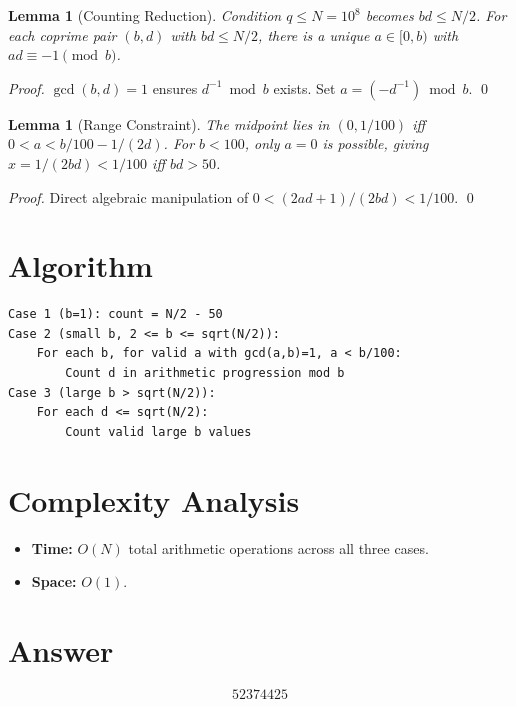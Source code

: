 \documentclass[12pt]{article}
\newtheorem{lemma}[theorem]{Lemma}
\begin{document}
\begin{lemma}[Counting Reduction]
Condition $q \leq N = 10^8$ becomes $bd \leq N/2$. For each coprime pair $(b, d)$ with $bd \leq N/2$, there is a unique $a \in [0, b)$ with $ad \equiv -1 \pmod{b}$.
\end{lemma}

\begin{proof}
$\gcd(b, d) = 1$ ensures $d^{-1} \bmod b$ exists. Set $a = (-d^{-1}) \bmod b$. \qed
\end{proof}

\begin{lemma}[Range Constraint]
The midpoint lies in $(0, 1/100)$ iff $0 < a < b/100 - 1/(2d)$. For $b < 100$, only $a = 0$ is possible, giving $x = 1/(2bd) < 1/100$ iff $bd > 50$.
\end{lemma}

\begin{proof}
Direct algebraic manipulation of $0 < (2ad+1)/(2bd) < 1/100$. \qed
\end{proof}

\section{Algorithm}

\begin{verbatim}
Case 1 (b=1): count = N/2 - 50
Case 2 (small b, 2 <= b <= sqrt(N/2)):
    For each b, for valid a with gcd(a,b)=1, a < b/100:
        Count d in arithmetic progression mod b
Case 3 (large b > sqrt(N/2)):
    For each d <= sqrt(N/2):
        Count valid large b values
\end{verbatim}

\section{Complexity Analysis}

\begin{itemize}
    \item \textbf{Time:} $O(N)$ total arithmetic operations across all three cases.
    \item \textbf{Space:} $O(1)$.
\end{itemize}

\section{Answer}

\[
\boxed{52374425}
\]
\end{document}
